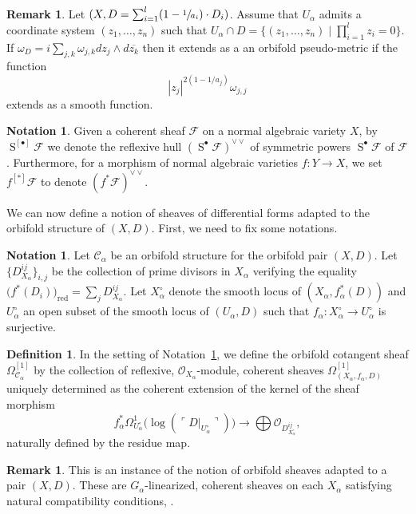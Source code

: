 \documentclass[10pt]{amsart}
\let\mathcal\mathscr
\let\scr\mathscr
\let\oldbullet\bullet
\newcommand{\sbullet}{{\scriptscriptstyle\oldbullet}}
\let\bullet\sbullet
\theoremstyle{plain}
\theoremstyle{definition}
\newtheorem{definition}[theorem]{Definition}
\newtheorem{remark}[theorem]{Remark}
\newtheorem{notation}[theorem]{Notation}
\numberwithin{equation}{theorem}
\DeclareMathOperator{\red}{red}
\DeclareMathOperator{\Sym}{S}
\newcommand{\sF}{\scr{F}}
\newcommand{\sO}{\scr{O}}
\begin{document}
\begin{remark}
Let $(X, D =\sum_{i=1}^l (1-\sfrac{1}{a_i})\cdot D_i)$. Assume that $U_{\alpha}$ admits a coor\-dinate system $(z_1, \ldots, z_n)$ such that $U_{\alpha}\cap D = \{ (z_1, \ldots, z_n) \mid \prod_{i=1}^l z_i =0 \}$. If $\omega_D=i\sum_{j,k} \omega_{j,k} dz_j \wedge d\overline{z_k}$ then it extends as a an orbifold pseudo-metric if the function $$|z_j|^{2(1-1/a_j)}\omega_{j,j}$$ extends as a smooth function.
\end{remark}

\begin{notation}
Given a coherent sheaf $\sF$ on a normal algebraic variety $X$, by $\Sym ^{[\bullet]}\sF$
we denote the reflexive hull $(\Sym^{\bullet}\sF)^{\vee\vee}$ of symmetric powers
$\Sym^{\bullet}\sF$ of $\sF$. Furthermore, for a morphism of normal
algebraic varieties $f: Y \to X$, we set $f^{[*]}\sF$ to denote $(f^*\sF)^{\vee \vee}$.
\end{notation}

We can now define a notion of sheaves of differential forms adapted to the orbifold
structure of $(X,D)$. First, we need to fix some notations.

\begin{notation}\label{not:orbi}
Let $\mathcal C_{\alpha}$ be an orbifold structure for the orbifold pair $(X,D)$.
Let $\{ D_{X_{\alpha}}^{ij} \}_{i, j}$ be the collection of prime divisors in $X_{\alpha}$ verifying the
equality $\bigl(f^*(D_i)\bigr)_{\red}= \sum_j D^{ij}_{X_{\alpha}}$.
Let $X_{\alpha}^\circ$ denote the smooth locus of
$(X_{\alpha}, f_{\alpha}^*(D))$ and $U_{\alpha}^\circ$ an open subset of
the smooth locus of $(U_{\alpha}, D)$ such that $f_{\alpha}: X_{\alpha}^\circ\to U_{\alpha}^\circ$ is surjective.
\end{notation}

\begin{definition}\label{def:OrbiCot}
In the setting of Notation~\ref{not:orbi}, we define the
orbifold cotangent sheaf $\Omega_{\mathcal C_{\alpha}}^{[1]}$ by the collection
of reflexive, $\sO_{X_{\alpha}}$-module, coherent sheaves $\Omega^{[1]}_{(X_{\alpha}, f_{\alpha}, D)}$
uniquely determined as the coherent extension of the
kernel of the sheaf morphism
$$
f_{\alpha}^*\Omega^1_{U_{\alpha}^\circ} \big( \log ( \ulcorner D |_{U_{\alpha}^\circ} \urcorner) \big)
\to \bigoplus \sO_{D_{X_{\alpha}^\circ}^{ij}},
$$
naturally defined by the residue map.
\end{definition}

\begin{remark}
This is an instance of the notion of orbifold sheaves adapted to a pair $(X,D)$.
These are $G_{\alpha}$-linearized, coherent sheaves on each $X_{\alpha}$
satisfying natural compatibility conditions, \cf \cite[\S2.6]{GT16}.
\end{remark}
\end{document}
